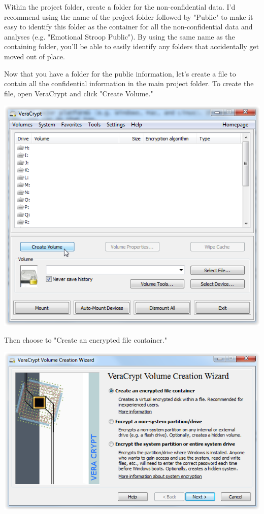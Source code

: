 \documentclass[12pt]{article}
\begin{document}
Within the project folder, create a folder for the non-confidential data. I'd recommend using
the name of the project folder followed by "Public" to make it easy to identify this folder
as the container for all the non-confidential data and analyses (e.g. "Emotional Stroop
Public"). By using the same name as the containing folder, you'll be able to easily identify
any folders that accidentally get moved out of place.

Now that you have a folder for the public information, let's create a file to contain all the
confidential information in the main project folder. To create the file, open VeraCrypt and click "Create Volume."

\includegraphics{imgs/VC01.PNG}

Then choose to "Create an encrypted file container."

\includegraphics{imgs/VC02.PNG}
\end{document}
